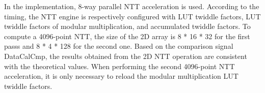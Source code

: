 In the implementation, 8-way parallel NTT acceleration is used. According to the timing, the NTT engine is respectively configured with LUT twiddle factors, LUT twiddle factors of modular multiplication, and accumulated twiddle factors. To compute a 4096-point NTT, the size of the 2D array is 8 * 16 * 32 for the first passs and 8 * 4 * 128 for the second one. Based on the comparison signal DataCalCmp, the results obtained from the 2D NTT operation are consistent with the theoretical values. When performing the second 4096-point NTT acceleration, it is only necessary to reload the modular multiplication LUT twiddle factors.
